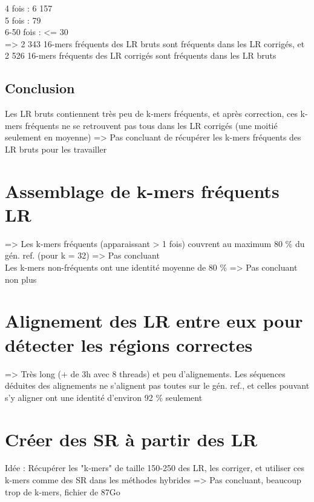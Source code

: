 \documentclass[12pt]{article}
\begin{document}
4 fois : 6 157 \\

5 fois : 79 \\

6-50 fois : <= 30 \\

=> 2 343 16-mers fréquents des LR bruts sont fréquents dans les LR corrigés, et 2 526 16-mers fréquents des LR corrigés sont fréquents dans les LR bruts \\

\subsection{Conclusion}

Les LR bruts contiennent très peu de k-mers fréquents, et après correction, ces k-mers fréquents ne se retrouvent pas tous dans les LR corrigés (une moitié seulement en moyenne) => Pas concluant de récupérer les k-mers fréquents des LR bruts pour les travailler

\section{Assemblage de k-mers fréquents LR}

=> Les k-mers fréquents (apparaissant > 1 fois) couvrent au maximum 80 \% du gén. ref. (pour k = 32) => Pas concluant \\

Les k-mers non-fréquents ont une identité moyenne de 80 \% => Pas concluant non plus

\section{Alignement des LR entre eux pour détecter les régions correctes}

=> Très long (+ de 3h avec 8 threads) et peu d'alignements. Les séquences déduites des alignements ne s'alignent pas toutes sur le gén. ref., et celles pouvant s'y aligner ont une identité d'environ 92 \% seulement

\section{Créer des SR à partir des LR}

Idée : Récupérer les "k-mers" de taille 150-250 des LR, les corriger, et utiliser ces k-mers comme des SR dans les méthodes hybrides => Pas concluant,
beaucoup trop de k-mers, fichier de 87Go \\
\end{document}
